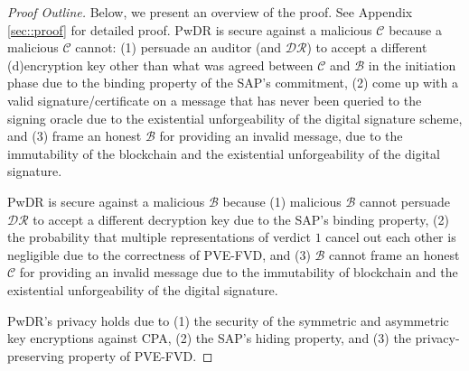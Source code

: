 

\begin{proof}[Proof Outline]
Below, we present an overview of the proof. See Appendix \ref{sec::proof} for detailed proof. PwDR is secure against a malicious $\mathcal{C}$ because a malicious  $\mathcal{C}$ cannot: (1) persuade an auditor (and $\mathcal{DR}$) to accept a different (d)encryption key other than what was agreed between $\mathcal{C}$ and $\mathcal{B}$ in the initiation phase due to the binding property of the SAP’s commitment, (2) come up with a valid signature/certificate on a message that has never been queried to the signing oracle due to the existential unforgeability of the digital signature scheme, and (3) frame an honest $\mathcal{B}$ for providing an invalid message, due to the immutability of the blockchain and the existential unforgeability of the digital signature.



PwDR is secure against a malicious  $\mathcal{B}$ because (1) malicious  $\mathcal{B}$  cannot persuade $\mathcal{DR}$ to accept a different decryption key due to the SAP’s binding property, 
 (2) the probability that multiple representations of verdict $1$ cancel out
each other is negligible due to the correctness of PVE-FVD, and (3) $\mathcal{B}$ cannot frame an honest $\mathcal{C}$ for providing an invalid message due to the immutability of blockchain and the existential unforgeability of the digital signature.







%


PwDR's privacy holds due to (1) the security of the symmetric and asymmetric key encryptions against CPA,  (2) the SAP's hiding property, and (3) the privacy-preserving property of PVE-FVD.  
\end{proof}